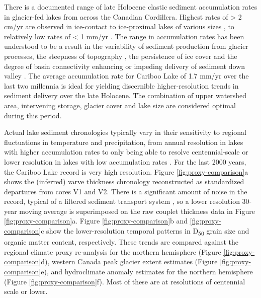 \documentclass[Royal,times,doublespace,sageh]{sagej}
\begin{document}
There is a documented range of late Holocene clastic sediment
accumulation rates in glacier-fed lakes from across the Canadian
Cordillera. Highest rates of \textgreater{} 2 cm/yr are observed in
ice-contact to ice-proximal lakes of various sizes
\citep{Desloges1994d, Crookshanks2008}, to relatively low rates of
\textless{} 1 mm/yr \citep{Gilbert2012}. The range in accumulation rates
has been understood to be a result in the variability of sediment
production from glacier processes, the steepness of topography
\citep{Ballantyne2002}, the persistence of ice cover and the degree of
basin connectivity enhancing or impeding delivery of sediment down
valley \citep{Wohl2019}. The average accumulation rate for Cariboo Lake
of 1.7 mm/yr over the last two millennia is ideal for yielding
discernible higher-resolution trends in sediment delivery over the late
Holocene. The combination of upper watershed area, intervening storage,
glacier cover and lake size are considered optimal during this period.

Actual lake sediment chronologies typically vary in their sensitivity to
regional fluctuations in temperature and precipitation, from annual
resolution in lakes with higher accumulation rates
\citep[e.g.][]{Menounos2008} to only being able to resolve
centennial-scale or lower resolution in lakes with low accumulation
rates \citep[e.g.][]{Desloges1999}. For the last 2000 years, the Cariboo
Lake record is very high resolution. Figure \ref{fig:proxy-comparison}a
shows the (inferred) varve thickness chronology reconstructed as
standardized departures from cores V1 and V2. There is a significant
amount of noise in the record, typical of a filtered sediment transport
system \citep[e.g.][]{Jerolmack2010}, so a lower resolution 30-year
moving average is superimposed on the raw couplet thickness data in
Figure \ref{fig:proxy-comparison}a. Figure \ref{fig:proxy-comparison}b
and \ref{fig:proxy-comparison}c show the lower-resolution temporal
patterns in D\textsubscript{50} grain size and organic matter content,
respectively. These trends are compared against the \citet{Moberg2005}
regional climate proxy re-analysis for the northern hemisphere (Figure
\ref{fig:proxy-comparison}d), \citet{Solomina2016} western Canada peak
glacier extent estimates (Figure \ref{fig:proxy-comparison}e), and
\citet{Ljungqvist2016} hydroclimate anomaly estimates for the northern
hemisphere (Figure \ref{fig:proxy-comparison}f). Most of these are at
resolutions of centennial scale or lower.
\end{document}
